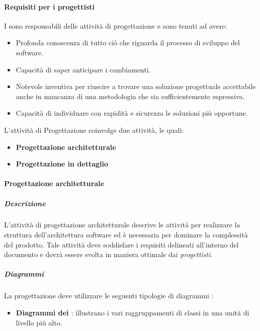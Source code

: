 \paragraph{Requisiti per i progettisti}
I \textit{\ProgP} sono responsabili delle attività di progettazione e sono tenuti ad avere:
\begin{itemize}
\item
Profonda conoscenza di tutto ciò che riguarda il processo di sviluppo del software.
\item
Capacità di saper anticipare i cambiamenti.
\item
Notevole inventiva per riuscire a trovare una soluzione progettuale accettabile anche in mancanza di una metodologia che sia sufficientemente espressiva.
\item
Capacità di individuare con rapidità e sicurezza le soluzioni più opportune.
\end{itemize}

L'attività di Progettazione coinvolge due attività, le quali:
\begin{itemize}
\item \textbf{Progettazione architetturale}
\item \textbf{Progettazione in dettaglio}
\end{itemize}

\paragraph{Progettazione architetturale}
\subparagraph{Descrizione}
L'attività di progettazione architetturale descrive le attività per realizzare la struttura dell'architettura software ed è necessaria per dominare la complessità del prodotto. Tale attività deve soddisfare i requisiti delineati all'interno del documento \AdR{} e dovrà essere svolta in maniera ottimale dai \textit{progettisti}.

\subparagraph{Diagrammi}
La progettazione deve utilizzare le seguenti tipologie di diagrammi :
\begin{itemize}
\item
\textbf{Diagrammi dei \textit{}}: illustrano i vari raggruppamenti di classi in una unità di livello più alto.
\end{itemize}

